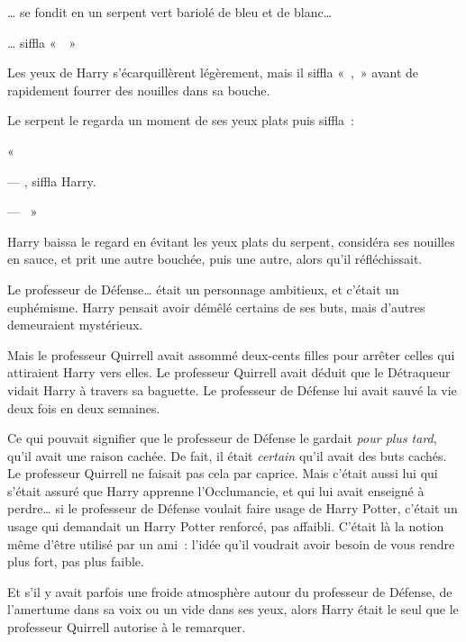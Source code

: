 … se fondit en un serpent vert bariolé de bleu et de blanc…

… siffla «~~»

Les yeux de Harry s'écarquillèrent légèrement, mais il siffla «~,~» avant de rapidement fourrer des nouilles dans sa bouche.

Le serpent le regarda un moment de ses yeux plats puis siffla~:

«~

--- , siffla Harry.

--- ~»

Harry baissa le regard en évitant les yeux plats du serpent, considéra ses nouilles en sauce, et prit une autre bouchée, puis une autre, alors qu'il réfléchissait.

Le professeur de Défense… était un personnage ambitieux, et c'était un euphémisme. Harry pensait avoir démêlé certains de ses buts, mais d'autres demeuraient mystérieux.

Mais le professeur Quirrell avait assommé deux-cents filles pour arrêter celles qui attiraient Harry vers elles. Le professeur Quirrell avait déduit que le Détraqueur vidait Harry à travers sa baguette. Le professeur de Défense lui avait sauvé la vie deux fois en deux semaines.

Ce qui pouvait signifier que le professeur de Défense le gardait \emph{pour plus tard}, qu'il avait une raison cachée. De fait, il était \emph{certain} qu'il avait des buts cachés. Le professeur Quirrell ne faisait pas cela par caprice. Mais c'était aussi lui qui s'était assuré que Harry apprenne l'Occlumancie, et qui lui avait enseigné à perdre… si le professeur de Défense voulait faire usage de Harry Potter, c'était un usage qui demandait un Harry Potter renforcé, pas affaibli. C'était là la notion même d'être utilisé par un ami~: l'idée qu'il voudrait avoir besoin de vous rendre plus fort, pas plus faible.

Et s'il y avait parfois une froide atmosphère autour du professeur de Défense, de l'amertume dans sa voix ou un vide dans ses yeux, alors Harry était le seul que le professeur Quirrell autorise à le remarquer.

